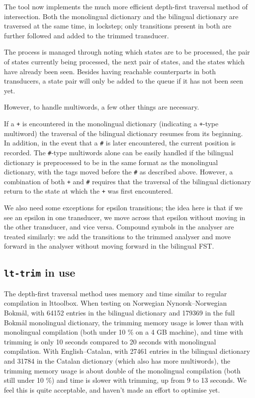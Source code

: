 \documentclass[10pt, a4paper]{article}
\newcommand{\ana}[1]{\texttt{#1}}
\newcommand{\tool}[1]{\texttt{#1}}
\begin{document}
The tool now implements the much more efficient depth-first traversal
method of intersection. Both the monolingual dictionary and the
bilingual dictionary are traversed at the same time, in lockstep; only
transitions present in both are further followed and added to the
trimmed transducer.

The process is managed through noting which states are to be
processed, the pair of states currently being processed, the next pair
of states, and the states which have already been seen. Besides having
reachable counterparts in both transducers, a state pair will only be
added to the queue if it has not been seen yet.

However, to handle multiwords, a few other things are necessary.

If a \ana{+} is encountered in the monolingual dictionary (indicating
a \ana{+}-type multiword) the traversal of the bilingual dictionary
resumes from its beginning. In addition, in the event that a \ana{\#}
is later encountered, the current position is recorded. The
\ana{\#}-type multiwords alone can be easily handled if the bilingual
dictionary is preprocessed to be in the same format as the monolingual
dictionary, with the tags moved before the \ana{\#} as described
above. However, a combination of both \ana{+} and \ana{\#} requires
that the traversal of the bilingual dictionary return to the state at
which the \ana{+} was first encountered.

We also need some exceptions for epsilon transitions; the idea here is
that if we see an epsilon in one transducer, we move across that
epsilon without moving in the other transducer, and vice versa.
Compound symbols in the analyser are treated similarly: we add the
transitions to the trimmed analyser and move forward in the analyser
without moving forward in the bilingual FST.

\subsection{\tool{lt-trim} in use}

The depth-first traversal method uses memory and time similar to
regular compilation in lttoolbox. When testing on Norwegian
Nynorsk--Norwegian Bokmål, with 64152 entries in the bilingual
dictionary and 179369 in the full Bokmål monolingual dictionary, the
trimming memory usage is lower than with monolingual compilation (both
under 10 \% on a 4 GB machine), and time with trimming is only 10
seconds compared to 20 seconds with monolingual compilation. With
English--Catalan, with 27461 entries in the bilingual dictionary and
31784 in the Catalan dictionary (which also has more multiwords), the
trimming memory usage is about double of the monolingual compilation
(both still under 10 \%) and time is slower with trimming, up from 9
to 13 seconds. We feel this is quite acceptable, and haven't made an
effort to optimise yet.
\end{document}
